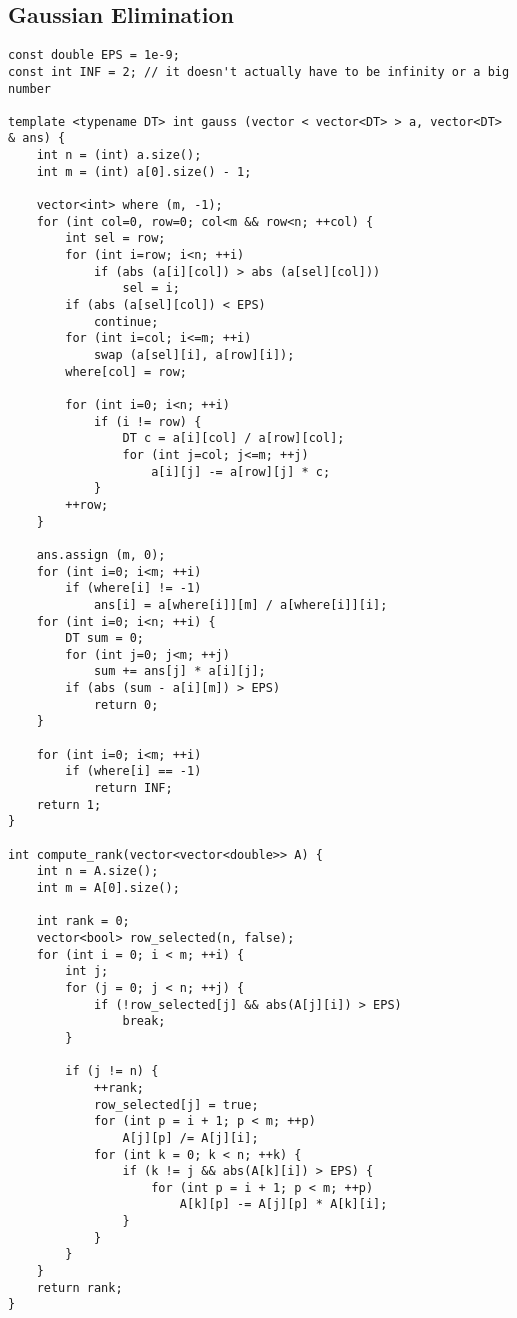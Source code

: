 \documentclass[10pt,a4paper,onesided]{article}
\begin{document}
\begin{multicols*}{3}
\subsection{Gaussian Elimination}
\begin{lstlisting}
const double EPS = 1e-9;
const int INF = 2; // it doesn't actually have to be infinity or a big number

template <typename DT> int gauss (vector < vector<DT> > a, vector<DT> & ans) {
    int n = (int) a.size();
    int m = (int) a[0].size() - 1;

    vector<int> where (m, -1);
    for (int col=0, row=0; col<m && row<n; ++col) {
        int sel = row;
        for (int i=row; i<n; ++i)
            if (abs (a[i][col]) > abs (a[sel][col]))
                sel = i;
        if (abs (a[sel][col]) < EPS)
            continue;
        for (int i=col; i<=m; ++i)
            swap (a[sel][i], a[row][i]);
        where[col] = row;

        for (int i=0; i<n; ++i)
            if (i != row) {
                DT c = a[i][col] / a[row][col];
                for (int j=col; j<=m; ++j)
                    a[i][j] -= a[row][j] * c;
            }
        ++row;
    }

    ans.assign (m, 0);
    for (int i=0; i<m; ++i)
        if (where[i] != -1)
            ans[i] = a[where[i]][m] / a[where[i]][i];
    for (int i=0; i<n; ++i) {
        DT sum = 0;
        for (int j=0; j<m; ++j)
            sum += ans[j] * a[i][j];
        if (abs (sum - a[i][m]) > EPS)
            return 0;
    }

    for (int i=0; i<m; ++i)
        if (where[i] == -1)
            return INF;
    return 1;
}

int compute_rank(vector<vector<double>> A) {
    int n = A.size();
    int m = A[0].size();

    int rank = 0;
    vector<bool> row_selected(n, false);
    for (int i = 0; i < m; ++i) {
        int j;
        for (j = 0; j < n; ++j) {
            if (!row_selected[j] && abs(A[j][i]) > EPS)
                break;
        }

        if (j != n) {
            ++rank;
            row_selected[j] = true;
            for (int p = i + 1; p < m; ++p)
                A[j][p] /= A[j][i];
            for (int k = 0; k < n; ++k) {
                if (k != j && abs(A[k][i]) > EPS) {
                    for (int p = i + 1; p < m; ++p)
                        A[k][p] -= A[j][p] * A[k][i];
                }
            }
        }
    }
    return rank;
}\end{lstlisting}

\end{multicols*}
\end{document}
